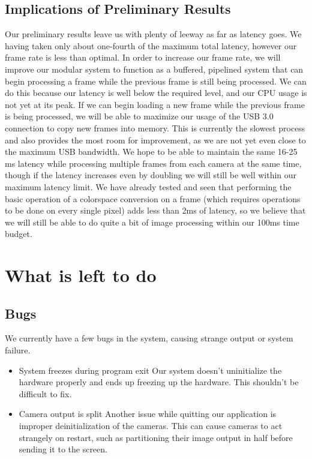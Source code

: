 \documentclass[letterpaper,10pt,titlepage]{IEEEtran}
\begin{document}
  \subsection{Implications of Preliminary Results}
  Our preliminary results leave us with plenty of leeway as far as latency goes. We having taken only about one-fourth of the maximum total latency, however our frame rate is less than optimal. In order to increase our frame rate, we will improve our modular system to function as a buffered, pipelined system that can begin processing a frame while the previous frame is still being processed. We can do this because our latency is well below the required level, and our CPU usage is not yet at its peak. If we can begin loading a new frame while the previous frame is being processed, we will be able to maximize our usage of the USB 3.0 connection to copy new frames into memory. This is currently the slowest process and also provides the most room for improvement, as we are not yet even close to the maximum USB bandwidth. We hope to be able to maintain the same 16-25 ms latency while processing multiple frames from each camera at the same time, though if the latency increases even by doubling we will still be well within our maximum latency limit. We have already tested and seen that performing the basic operation of a colorspace conversion on a frame (which requires operations to be done on every single pixel) adds less than 2ms of latency, so we believe that we will still be able to do quite a bit of image processing within our 100ms time budget.
  
  \section{What is left to do}
	\subsection{Bugs}
	We currently have a few bugs in the system, causing strange output or system failure.
	\begin{itemize}
		\item System freezes during program exit
		Our system doesn't uninitialize the hardware properly and ends up freezing up the hardware. This shouldn't be difficult to fix.
		\item Camera output is split
		Another issue while quitting our application is improper deinitialization of the cameras. This can cause cameras to act strangely on restart, such as partitioning their image output in half before sending it to the screen.
	\end{itemize}
	
\end{document}
